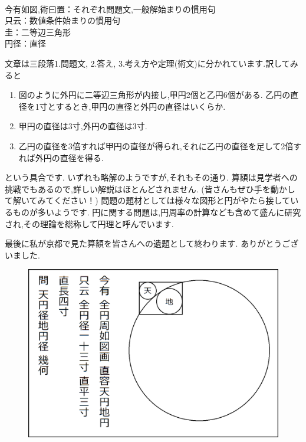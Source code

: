\documentclass[./main]{subfiles}
\begin{document}
\begin{flushleft}
[用語] \\
今有如図,術曰置：それぞれ問題文,一般解始まりの慣用句 \\
只云：数値条件始まりの慣用句 \\
圭：二等辺三角形 \\
円径：直径
\end{flushleft}

文章は三段落1.問題文, 2.答え, 3.考え方や定理(術文)に分かれています.訳してみると

\begin{enumerate}
\item 図のように外円に二等辺三角形が内接し,甲円2個と乙円6個がある. 乙円の直径を1寸とするとき,甲円の直径と外円の直径はいくらか.
\item 甲円の直径は3寸,外円の直径は3寸.
\item 乙円の直径を3倍すれば甲円の直径が得られ,それに乙円の直径を足して2倍すれば外円の直径を得る.
\end{enumerate}
という具合です. いずれも略解のようですが,それもその通り. 算額は見学者への挑戦でもあるので,詳しい解説はほとんどされません. (皆さんもぜひ手を動かして解いてみてください！)
問題の題材としては様々な図形と円がやたら接しているものが多いようです. 円に関する問題は,円周率の計算なども含めて盛んに研究され,その理論を総称して円理と呼んでいます.

最後に私が京都で見た算額を皆さんへの遺題として終わります. ありがとうございました.

\begin{figure}[H]
\begin{center}
\includegraphics[width=13cm]{ookuwa4.png}
\end{center}
\end{figure}
\end{document}
